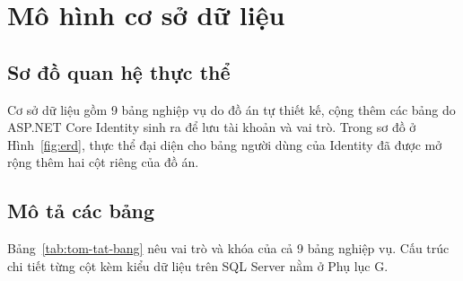 \section{Mô hình cơ sở dữ liệu}
\label{sec:mo-hinh-csdl}

\subsection{Sơ đồ quan hệ thực thể}

Cơ sở dữ liệu gồm 9 bảng nghiệp vụ do đồ án tự thiết kế, cộng thêm các bảng do
ASP.NET Core Identity sinh ra để lưu tài khoản và vai trò. Trong sơ đồ ở
Hình~\ref{fig:erd}, thực thể  đại diện cho bảng người dùng
của Identity đã được mở rộng thêm hai cột riêng của đồ án.



\subsection{Mô tả các bảng}
\label{sec:mo-ta-bang}

Bảng~\ref{tab:tom-tat-bang} nêu vai trò và khóa của cả 9 bảng nghiệp vụ. Cấu
trúc chi tiết từng cột kèm kiểu dữ liệu trên SQL Server nằm ở Phụ lục G.

